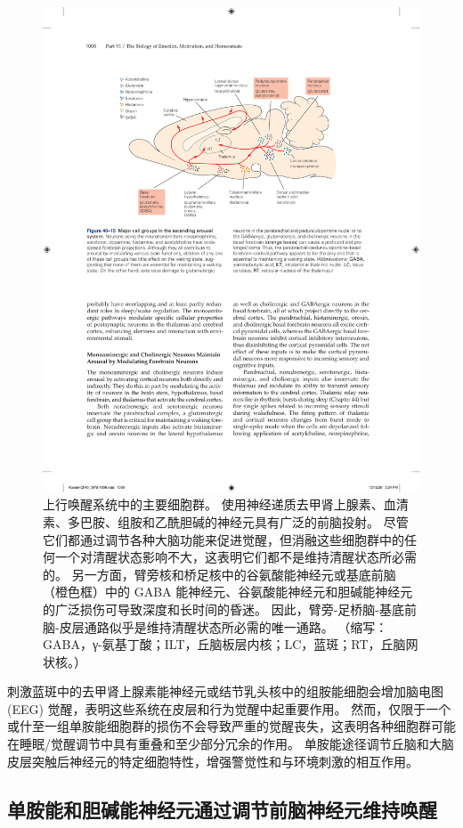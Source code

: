 \begin{figure}[htbp]
	\centering
	\includegraphics[width=0.8\linewidth]{chap40/fig_40_15}
	\caption{上行唤醒系统中的主要细胞群。 使用神经递质去甲肾上腺素、血清素、多巴胺、组胺和乙酰胆碱的神经元具有广泛的前脑投射。 尽管它们都通过调节各种大脑功能来促进觉醒，但消融这些细胞群中的任何一个对清醒状态影响不大，这表明它们都不是维持清醒状态所必需的。 另一方面，臂旁核和桥足核中的谷氨酸能神经元或基底前脑（橙色框）中的 GABA 能神经元、谷氨酸能神经元和胆碱能神经元的广泛损伤可导致深度和长时间的昏迷。 因此，臂旁-足桥脑-基底前脑-皮层通路似乎是维持清醒状态所必需的唯一通路。 （缩写：GABA，γ-氨基丁酸；ILT，丘脑板层内核；LC，蓝斑；RT，丘脑网状核。）}
	\label{fig:40_15}
\end{figure}

刺激蓝斑中的去甲肾上腺素能神经元或结节乳头核中的组胺能细胞会增加脑电图 (EEG) 觉醒，表明这些系统在皮层和行为觉醒中起重要作用。 然而，仅限于一个或什至一组单胺能细胞群的损伤不会导致严重的觉醒丧失，这表明各种细胞群可能在睡眠/觉醒调节中具有重叠和至少部分冗余的作用。 单胺能途径调节丘脑和大脑皮层突触后神经元的特定细胞特性，增强警觉性和与环境刺激的相互作用。

\subsection{单胺能和胆碱能神经元通过调节前脑神经元维持唤醒}

